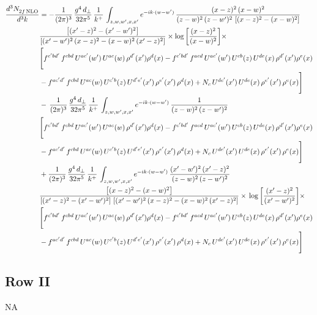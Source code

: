 \documentclass[9pt]{article}
\numberwithin{equation}{section}
\begin{document}
\begin{align}
    \frac{d^{3}N_{2f\,\rm NLO}^{\rm}}{d^{3}k}  & =   - \frac{1}{(2\pi)^{3}}\, \frac{g^{4}\,d_{\perp}}{32\pi^{5}}\,\frac{1}{k^{+}}\,\int_{z,w,w^{\prime},x,x'} e^{-ik\cdot (w-w')}\,\frac{(x-z)^{2}\, (x-w)^{2}}{(z-w)^{2}\, (z-w')^{2}\,\left[(x-z)^{2} - (x-w)^{2}\right]}\notag \\ & \frac{\left[(x'-z)^{2}-(x'-w')^{2}\right]}{\left[(x'-w')^{2}\, (x-z)^{2} - (x-w)^{2}\, (x'-z)^{2}\right]}\times \log{\left[\frac{(x-z)^{2}}{(x-w)^{2}}\right]}\times\notag \\ & \Bigg[f^{c'bd'}\,f^{cbd}\, U^{ac'}(w')\,U^{ac}(w)\,\rho^{d'}(x')\rho^{d}(x)- f^{c'bd'}\,f^{acd}\,U^{ac'}(w')\,U^{cb}(z)\,U^{de}(x)\,\rho^{d'}(x')\rho^{e}(x) \notag \\ & -f^{ac'd'}\,f^{cbd}\,U^{ac}(w)\,U^{c'b}(z)\,U^{d'e'}(x')\,\rho^{e'}(x')\,\rho^{d}(x) +N_{c}\,U^{de'}(x')\,U^{de}(x)\,\rho^{e'}(x')\,\rho^{e}(x)\Bigg]  \notag \\
& -\, \frac{1}{(2\pi)^{3}}\, \frac{g^{4}\,d_{\perp}}{32\pi^{5}}\,\frac{1}{k^{+}}\,\int_{z,w,w^{\prime},x,x'} e^{-ik\cdot (w-w')}\,\frac{1}{(z-w)^{2}\, (z-w')^{2}}\notag \\ & \Bigg[f^{c'bd'}\,f^{cbd}\, U^{ac'}(w')\,U^{ac}(w)\,\rho^{d'}(x')\rho^{d}(x)- f^{c'bd'}\,f^{acd}\,U^{ac'}(w')\,U^{cb}(z)\,U^{de}(x)\,\rho^{d'}(x')\rho^{e}(x) \notag \\ & -f^{ac'd'}\,f^{cbd}\,U^{ac}(w)\,U^{c'b}(z)\,U^{d'e'}(x')\,\rho^{e'}(x')\,\rho^{d}(x) +N_{c}\,U^{de'}(x')\,U^{de}(x)\,\rho^{e'}(x')\,\rho^{e}(x)\Bigg]  \notag \\
& + \frac{1}{(2\pi)^{3}}\, \frac{g^{4}\,d_{\perp}}{32\pi^{5}}\,\frac{1}{k^{+}}\,\int_{z,w,w^{\prime},x,x'} e^{-ik\cdot (w-w')}\,\frac{(x'-w')^{2}\, (x'-z)^{2}}{(z-w)^{2}\, (z-w')^{2}}\notag \\ & \frac{\left[(x-z)^{2} - (x-w)^{2}\right]}{\left[(x'-z)^{2} - (x'-w')^{2}\right]\, \left[(x'-w')^{2}\, (x - z)^{2} - (x-w)^{2}\,(x'-z)^{2}\right]}\times\, \log{\left[\frac{(x'-z)^{2}}{(x'-w')^{2}}\right]}\times \notag \\ &  \Bigg[f^{c'bd'}\,f^{cbd}\, U^{ac'}(w')\,U^{ac}(w)\,\rho^{d'}(x')\rho^{d}(x)- f^{c'bd'}\,f^{acd}\,U^{ac'}(w')\,U^{cb}(z)\,U^{de}(x)\,\rho^{d'}(x')\rho^{e}(x) \notag \\ & -f^{ac'd'}\,f^{cbd}\,U^{ac}(w)\,U^{c'b}(z)\,U^{d'e'}(x')\,\rho^{e'}(x')\,\rho^{d}(x) +N_{c}\,U^{de'}(x')\,U^{de}(x)\,\rho^{e'}(x')\,\rho^{e}(x)\Bigg]
\end{align}
\subsection{Row II}
\textsc{NA}
\end{document}

